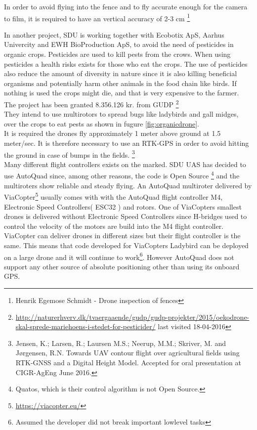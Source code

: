 In order to avoid flying into the fence and to fly accurate enough for the camera to film, it is required to have an vertical accuracy of 2-3 cm \footnote{Henrik Egemose Schmidt - Drone inspection of fences}

In another project, SDU is working together with Ecobotix ApS, Aarhus Univercity and EWH BioProduction ApS, to avoid the need of pesticides in organic crops. Pesticides are used to kill pests from the crows. When using pesticides a health risks exists for those who eat the crops. The use of pesticides also reduce the amount of diversity in nature since it is also killing beneficial organisms and potentially harm other animals in the food chain like birds. If nothing is used the crops might die, and that is very expensive to the farmer. The project has been granted 8.356.126 kr. from GUDP \footnote{\url{http://naturerhverv.dk/tvaergaaende/gudp/gudp-projekter/2015/oekodrone-skal-sprede-mariehoens-i-stedet-for-pesticider/} last visited 18-04-2016}\\
They intend to use multirotors to spread bugs like ladybirds and gall midges, over the crops to eat pests as shown in fugure \ref{fig:organicdrone}. \\
It is required the drones fly approximately 1 meter above ground at 1.5 meter/sec. It is therefore necessary to use an RTK-GPS in order to avoid hitting the ground in case of bumps in the fields. \footnote{Jensen, K.; Larsen, R.; Laursen M.S.; Neerup, M.M.; Skriver, M. and Jørgensen, R.N. Towards UAV contour flight over agricultural fields using RTK-GNSS and a Digital Height Model. Accepted for oral presentation at CIGR-AgEng June 2016.}\\


Many different flight controllers exists on the marked. SDU UAS has decided to use AutoQuad since, among other reasons, the code is Open Source \footnote{Quatos, which is their control algorithm is not Open Source.} and the multiroters show reliable and steady flying. An AutoQuad multiroter delivered by ViaCopter\footnote{\url{https://viacopter.eu/}} usually comes with with the AutoQuad flight controller M4, Electronic Speed Controllers( ESC32 ) and rotors. One of ViaCopters smallest drones is delivered without Electronic Speed Controllers since H-bridges used to control the velocity of the motors are build into the M4 flight controller.
ViaCopter can deliver drones in different sizes but their flight controller is the same. This means that code developed for ViaCopters Ladybird can be deployed on a large drone and it will continue to work\footnote{Assumed the developer did not break important lowlevel tasks}. However AutoQuad does not support any other source of absolute positioning other than using its onboard GPS. \\

